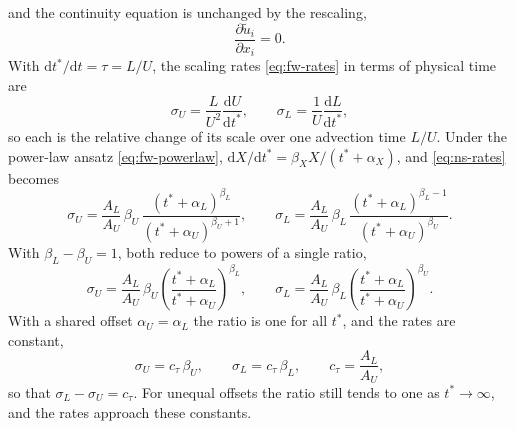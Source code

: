 \documentclass{article}
\begin{document}
and the continuity equation is unchanged by the rescaling,
\begin{equation}\label{eq:ns-nondim-continuity}
  \frac{\partial \tilde u_i}{\partial x_i} = 0.
\end{equation}
With $\mathrm{d}t^*/\mathrm{d}t = \tau = L/U$, the scaling rates
\eqref{eq:fw-rates} in terms of physical time are
\begin{equation}\label{eq:ns-rates}
  \sigma_U = \frac{L}{U^2}\frac{\mathrm{d} U}{\mathrm{d} t^*},
  \qquad
  \sigma_L = \frac{1}{U}\frac{\mathrm{d} L}{\mathrm{d} t^*},
\end{equation}
so each is the relative change of its scale over one advection time $L/U$.
Under the power-law ansatz \eqref{eq:fw-powerlaw},
$\mathrm{d}X/\mathrm{d}t^* = \beta_X X/(t^* + \alpha_X)$, and
\eqref{eq:ns-rates} becomes
\begin{equation}\label{eq:ns-rates-powerlaw}
  \sigma_U = \frac{A_L}{A_U}\, \beta_U\,
    \frac{(t^* + \alpha_L)^{\beta_L}}{(t^* + \alpha_U)^{\beta_U + 1}},
  \qquad
  \sigma_L = \frac{A_L}{A_U}\, \beta_L\,
    \frac{(t^* + \alpha_L)^{\beta_L - 1}}{(t^* + \alpha_U)^{\beta_U}} .
\end{equation}
With $\beta_L - \beta_U = 1$, both reduce to powers of a single ratio,
\begin{equation}\label{eq:ns-rates-powerlaw-beta}
  \sigma_U = \frac{A_L}{A_U}\, \beta_U
    \left( \frac{t^* + \alpha_L}{t^* + \alpha_U} \right)^{\beta_L},
  \qquad
  \sigma_L = \frac{A_L}{A_U}\, \beta_L
    \left( \frac{t^* + \alpha_L}{t^* + \alpha_U} \right)^{\beta_U} .
\end{equation}
With a shared offset $\alpha_U = \alpha_L$ the ratio is one for all $t^*$, and
the rates are constant,
\begin{equation}\label{eq:ns-rates-powerlaw-const}
  \sigma_U = c_\tau\, \beta_U,
  \qquad
  \sigma_L = c_\tau\, \beta_L,
  \qquad
  c_\tau = \frac{A_L}{A_U},
\end{equation}
so that $\sigma_L - \sigma_U = c_\tau$. For unequal offsets the ratio still
tends to one as $t^* \to \infty$, and the rates approach these constants.
\end{document}
